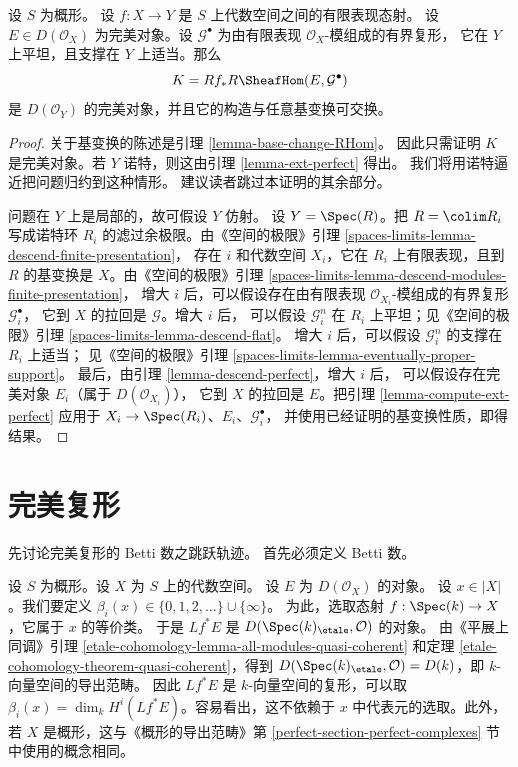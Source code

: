\begin{lemma}
\label{lemma-base-change-RHom-perfect}
设 $S$ 为概形。
设 $f : X \to Y$ 是 $S$ 上代数空间之间的有限表现态射。
设 $E \in D(\mathcal{O}_X)$ 为完美对象。设 $\mathcal{G}^\bullet$
为由有限表现 $\mathcal{O}_X$-模组成的有界复形，
它在 $Y$ 上平坦，且支撑在 $Y$ 上适当。那么
$$
K = Rf_*R\SheafHom(E, \mathcal{G}^\bullet)
$$
是 $D(\mathcal{O}_Y)$ 的完美对象，并且它的构造与任意基变换可交换。
\end{lemma}

\begin{proof}
关于基变换的陈述是引理 \ref{lemma-base-change-RHom}。
因此只需证明 $K$ 是完美对象。若 $Y$ 诺特，则这由引理
\ref{lemma-ext-perfect} 得出。
我们将用诺特逼近把问题归约到这种情形。
建议读者跳过本证明的其余部分。

\medskip\noindent
问题在 $Y$ 上是局部的，故可假设 $Y$ 仿射。
设 $Y = \Spec(R)$。把 $R = \colim R_i$ 写成诺特环
$R_i$ 的滤过余极限。由《空间的极限》引理
\ref{spaces-limits-lemma-descend-finite-presentation}，
存在 $i$ 和代数空间 $X_i$，它在 $R_i$ 上有限表现，且到
$R$ 的基变换是 $X$。由《空间的极限》引理
\ref{spaces-limits-lemma-descend-modules-finite-presentation}，
增大 $i$ 后，可以假设存在由有限表现
$\mathcal{O}_{X_i}$-模组成的有界复形 $\mathcal{G}_i^\bullet$，%
它到 $X$ 的拉回是 $\mathcal{G}$。增大 $i$ 后，%
可以假设 $\mathcal{G}_i^n$ 在 $R_i$ 上平坦；见《空间的极限》引理
\ref{spaces-limits-lemma-descend-flat}。
增大 $i$ 后，可以假设 $\mathcal{G}_i^n$ 的支撑在 $R_i$ 上适当；
见《空间的极限》引理
\ref{spaces-limits-lemma-eventually-proper-support}。
最后，由引理 \ref{lemma-descend-perfect}，增大 $i$ 后，
可以假设存在完美对象 $E_i$（属于 $D(\mathcal{O}_{X_i})$），
它到 $X$ 的拉回是 $E$。把引理
\ref{lemma-compute-ext-perfect} 应用于
$X_i \to \Spec(R_i)$、$E_i$、$\mathcal{G}_i^\bullet$，
并使用已经证明的基变换性质，即得结果。
\end{proof}

\section{完美复形}
\label{section-perfect-complexes}

\noindent
先讨论完美复形的 Betti 数之跳跃轨迹。
首先必须定义 Betti 数。

\medskip\noindent
设 $S$ 为概形。设 $X$ 为 $S$ 上的代数空间。
设 $E$ 为 $D(\mathcal{O}_X)$ 的对象。
设 $x \in |X|$。我们要定义
$\beta_i(x) \in \{0, 1, 2, \ldots \} \cup \{\infty\}$。
为此，选取态射 $f : \Spec(k) \to X$，它属于 $x$ 的等价类。
于是 $Lf^*E$ 是 $D(\Spec(k)_\etale, \mathcal{O})$ 的对象。
由《平展上同调》引理
\ref{etale-cohomology-lemma-all-modules-quasi-coherent} 和定理
\ref{etale-cohomology-theorem-quasi-coherent}，得到
$D(\Spec(k)_\etale, \mathcal{O}) = D(k)$，即 $k$-向量空间的导出范畴。
因此 $Lf^*E$ 是 $k$-向量空间的复形，可以取
$\beta_i(x) = \dim_k H^i(Lf^*E)$。容易看出，这不依赖于
$x$ 中代表元的选取。此外，若 $X$ 是概形，这与《概形的导出范畴》第
\ref{perfect-section-perfect-complexes} 节中使用的概念相同。

